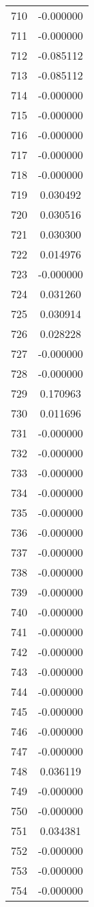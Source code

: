 \documentclass[12pt]{article}
\begin{document}
\begin{longtable}{@{}cc@{}}
710 & -0.000000 \\
711 & -0.000000 \\
712 & -0.085112 \\
713 & -0.085112 \\
714 & -0.000000 \\
715 & -0.000000 \\
716 & -0.000000 \\
717 & -0.000000 \\
718 & -0.000000 \\
719 & 0.030492 \\
720 & 0.030516 \\
721 & 0.030300 \\
722 & 0.014976 \\
723 & -0.000000 \\
724 & 0.031260 \\
725 & 0.030914 \\
726 & 0.028228 \\
727 & -0.000000 \\
728 & -0.000000 \\
729 & 0.170963 \\
730 & 0.011696 \\
731 & -0.000000 \\
732 & -0.000000 \\
733 & -0.000000 \\
734 & -0.000000 \\
735 & -0.000000 \\
736 & -0.000000 \\
737 & -0.000000 \\
738 & -0.000000 \\
739 & -0.000000 \\
740 & -0.000000 \\
741 & -0.000000 \\
742 & -0.000000 \\
743 & -0.000000 \\
744 & -0.000000 \\
745 & -0.000000 \\
746 & -0.000000 \\
747 & -0.000000 \\
748 & 0.036119 \\
749 & -0.000000 \\
750 & -0.000000 \\
751 & 0.034381 \\
752 & -0.000000 \\
753 & -0.000000 \\
754 & -0.000000 \\

\end{longtable}
\end{document}
